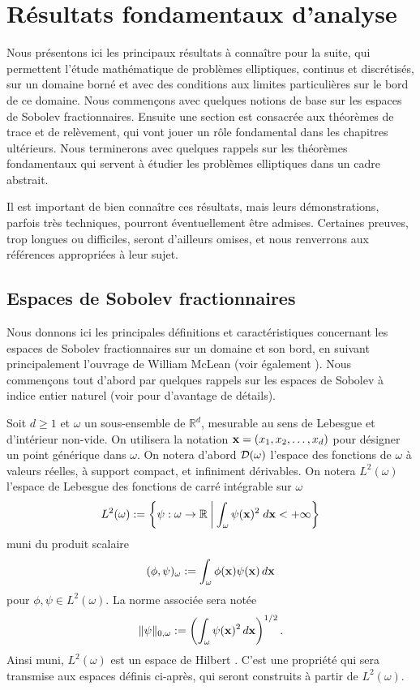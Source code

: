 \documentclass[11pt]{book}
\def\x{{\bf x}}
\newcommand{\caD}{{\cal D}}
\newcommand{\R}{\mathbb{R}}
\begin{document}
\chapter{Résultats fondamentaux d'analyse}
\label{ch:fond}

Nous présentons ici les principaux résultats à connaître pour la suite, qui permettent l'étude mathématique de problèmes elliptiques, continus et discrétisés, sur un domaine borné et avec des conditions aux limites particulières sur le bord de ce domaine. Nous commençons avec quelques notions de base sur les espaces de Sobolev fractionnaires. Ensuite une section est consacrée aux théorèmes de trace et de relèvement, qui vont jouer un rôle fondamental dans les chapitres ultérieurs. Nous terminerons avec quelques rappels sur les théorèmes fondamentaux qui servent à étudier les problèmes elliptiques dans un cadre abstrait.

Il est important de bien connaître ces résultats, mais leurs démonstrations, parfois très techniques, pourront éventuellement être admises. 
Certaines preuves, trop longues ou difficiles, seront d'ailleurs omises,
et nous renverrons aux références appropriées à leur sujet.

\section{Espaces de Sobolev fractionnaires}

Nous donnons ici les principales définitions et caractéristiques concernant les espaces de Sobolev fractionnaires sur un domaine et son bord, en suivant principalement l'ouvrage de William McLean \cite{mclean-2000} (voir également \cite{grisvard-85,steinbach-2008}). Nous commençons tout d'abord par quelques rappels sur les espaces de Sobolev à indice entier naturel (voir \cite{allaire-2007,adams-75,brezis-83} pour d'avantage de détails).

Soit $d \geq 1$ et $\omega$ un sous-ensemble de $\R^d$, mesurable au sens de Lebesgue et d'intérieur non-vide. On utilisera la notation $\x = (x_1, x_2, \ldots, x_d)$ pour désigner un point générique dans $\omega$.
On notera d'abord $\caD(\omega)$ l'espace des fonctions de $\omega$ à valeurs réelles, à support compact, et infiniment dérivables.
On notera $L^2(\omega)$ l'espace de Lebesgue des fonctions de carré intégrable sur $\omega$
\[
L^2(\omega) := \left \{ \psi : \omega \rightarrow \R \:\middle|\:  \int_{\omega} \psi(\x)^2 \;d\x < +\infty \right \}
\]
muni du produit scalaire 
\[
(\phi,\psi)_\omega := \int_{\omega} \phi(\x)\psi(\x) \,d\x
\]
pour $\phi, \psi \in L^2(\omega)$.
La norme associée sera notée 
\[
 \| \psi \|_{0,{\omega}} := \left ( \int_{\omega} \psi(\x)^2 \,d\x \right )^{1/2}. 
\]
Ainsi muni, $L^2(\omega)$ est un espace de Hilbert \cite{brezis-83}. C'est une propriété qui sera transmise aux espaces définis ci-après, qui seront construits à partir de $L^2(\omega)$.
\end{document}
